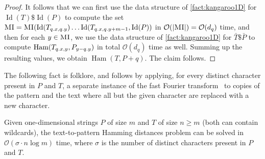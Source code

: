 \documentclass[twoside,leqno]{article}
\renewcommand{\O}{\mathcal{O}}
\DeclareMathOperator*{\Ham}{Ham}
\DeclareMathOperator*{\ID}{Id}
\newcommand{\absolute}[1]{\left\lvert#1\right\rvert}
\begin{document}
\begin{proof}
It follows that we can first use the data structure of \cref{fact:kangaroo1D} for  $\ID(T) \$ \ID(P)$ to compute the set $\MI =  \MI(\ID(T_{\x{q}, \y{q}}) \ldots \ID(T_{\x{q}, \y{q}+m-1}, \ID(P))$ in $\O(\absolute{\MI}) = \O(d_q)$ time, and then for each $y \in \textnormal{\textsc{MI}}$, we use the data structure of  \cref{fact:kangaroo1D}  for $\bar{T} \$ \bar{P}$ to compute 
$\Ham(T_{\x{q}, y}, P_{y-\y{q}})$ in total $\O(d_q)$ time as well. Summing up the resulting values, we obtain $\Ham(T, P+q)$. The claim follows. 
\end{proof}

The following fact is folklore, and follows by applying, for every distinct character present in $P$ and $T$, a separate instance of the fast Fourier transform~\cite{FischerP74} to copies of the pattern and the text where all but the given character are replaced with a new character.

\begin{fact}[folklore]\label{fact:sigman1d}
Given one-dimensional strings $P$ of size $m$ and $T$ of size $n \ge m$ (both can contain wildcards), the text-to-pattern Hamming distances problem can be solved in $\O(\sigma \cdot n \log m)$ time, where $\sigma$ is the number of distinct characters present in $P$ and $T$.
\end{fact}
\end{document}
